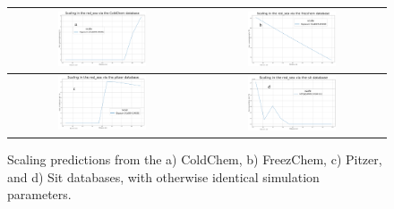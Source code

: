 \documentclass[journal=ACSES&TWater,manuscript=article]{achemso}
\begin{document}
\begin{figure}[h]
    \centering
    \begin{tabular}{c|c}
        \includegraphics[width=0.49\textwidth]{images/sensitivity_analyses/databases/ColdChem.png} 
        & \includegraphics[width=0.49\textwidth]{images/sensitivity_analyses/databases/FreezChem.png} \\ \midrule 
        \includegraphics[width=0.49\textwidth]{images/sensitivity_analyses/databases/Pitzer.png} 
        & \includegraphics[width=0.49\textwidth]{images/sensitivity_analyses/databases/Sit.png} 
        \\ \bottomrule
    \end{tabular}
    \caption{
        Scaling predictions from the a) ColdChem, b) FreezChem, c) Pitzer, and d) Sit databases, with otherwise identical simulation parameters.
    }
    \label{database_selection}
\end{figure}
\end{document}
